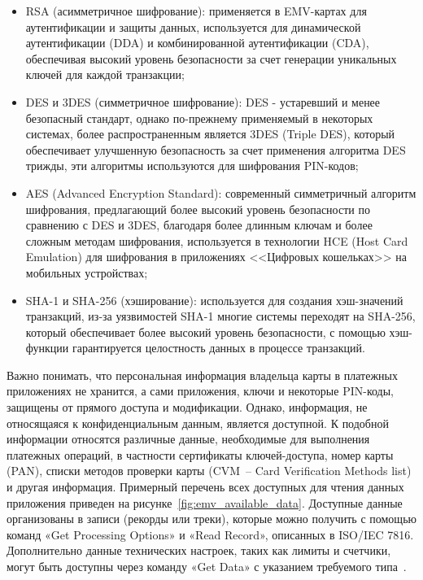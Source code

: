 \begin{itemize}
    \item RSA (асимметричное шифрование): применяется в EMV-картах для аутентификации и защиты данных, используется для динамической аутентификации (DDA) и комбинированной аутентификации (CDA), обеспечивая высокий уровень безопасности за счет генерации уникальных ключей для каждой транзакции;
    \item DES и 3DES (симметричное шифрование): DES - устаревший и менее безопасный стандарт, однако по-прежнему применяемый в некоторых системах, более распространенным является 3DES (Triple DES), который обеспечивает улучшенную безопасность за счет применения алгоритма DES трижды, эти алгоритмы используются для шифрования PIN-кодов;
    \item AES (Advanced Encryption Standard): современный симметричный алгоритм шифрования, предлагающий более высокий уровень безопасности по сравнению с DES и 3DES, благодаря более длинным ключам и более сложным методам шифрования, используется в технологии HCE (Host Card Emulation) для шифрования в приложениях <<Цифровых кошельках>> на мобильных устройствах;
    \item SHA-1 и SHA-256 (хэширование): используется для создания хэш-значений транзакций, из-за уязвимостей SHA-1 многие системы переходят на SHA-256, который обеспечивает более высокий уровень безопасности, с помощью хэш-функции гарантируется целостность данных в процессе транзакций.
\end{itemize}

Важно понимать, что персональная информация владельца карты в платежных приложениях не хранится, а сами приложения, ключи и некоторые PIN-коды, защищены от прямого доступа и модификации.
Однако, информация, не относящаяся к конфиденциальным данным, является доступной.
К подобной информации относятся различные данные, необходимые для выполнения платежных операций, в частности сертификаты ключей-доступа, номер карты (PAN), списки методов проверки карты (CVM~-- Card Verification Methods list) и другая информация.
Примерный перечень всех доступных для чтения данных приложения приведен на рисунке~\ref{fig:emv_available_data}.
Доступные данные организованы в записи (рекорды или треки), которые можно получить с помощью команд «Get Processing Options» и «Read Record», описанных  в ISO/IEC 7816.
Дополнительно данные технических настроек, таких как лимиты и счетчики, могут быть доступны через команду «Get Data» с указанием требуемого типа~\cite{emv_card_mechanism}.

